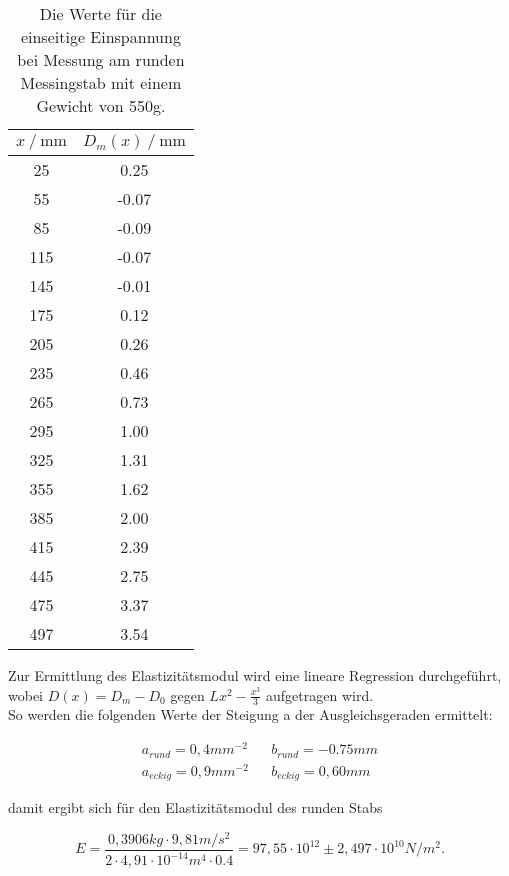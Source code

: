\begin{table}[H]
  \centering
  \caption{Die Werte für die einseitige Einspannung bei Messung am runden Messingstab mit einem Gewicht von 550g.}
  \begin{tabular}{cc}
    \toprule
    {$x \mathbin{/} \unit{\milli\metre}$} &
    {$D_m(x) \mathbin{/} \unit{\milli\metre}$} \\
    \midrule
     25 &  0.25 \\
     55 & -0.07 \\
     85 & -0.09 \\
    115 & -0.07 \\
    145 & -0.01 \\
    175 & 0.12 \\
    205 & 0.26 \\ 
    235 & 0.46 \\
    265 & 0.73 \\
    295 & 1.00 \\
    325 & 1.31 \\
    355 & 1.62 \\
    385 & 2.00 \\
    415 & 2.39 \\
    445 & 2.75 \\
    475 & 3.37 \\
    497 & 3.54 \\
    
    \bottomrule
  \end{tabular}
  \label{tab:Tabelle2}
\end{table}

Zur Ermittlung des Elastizitätsmodul wird eine lineare Regression durchgeführt, wobei $D(x) = D_m - D_0$ gegen 
$Lx^2 - \frac{x^3}{3}$ aufgetragen wird.\\
So werden die folgenden Werte der Steigung a der Ausgleichsgeraden ermittelt:

\begin{align*}
  a_{rund} = 0,4 mm^{-2} && b_{rund} = -0.75 mm \\
  a_{eckig} = 0,9 mm^{-2} && b_{eckig} = 0,60 mm
\end{align*}

damit ergibt sich für den Elastizitätsmodul des runden Stabs

\begin{equation*}
  E = \frac{0,3906kg \cdot 9,81m/s^2}{2 \cdot 4,91\cdot 10^{-14} m^4 \cdot 0.4} = 97,55 \cdot 10^{12} \pm 2,497 \cdot 10^{10} N/m^2.
\end{equation*}


